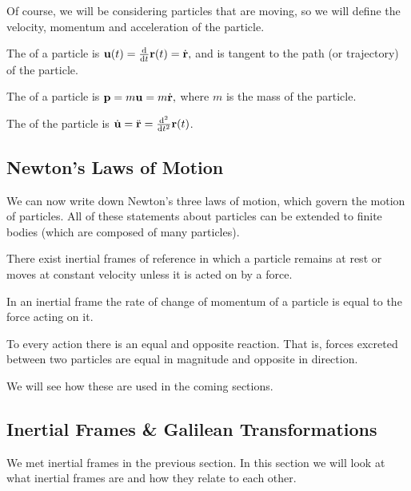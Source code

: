 \documentclass[a4paper]{scrartcl}
\newcommand{\newsection}{\subsection}
\begin{document}
Of course, we will be considering particles that are moving, so we will define the velocity, momentum and acceleration of the particle.

\begin{definition}[Velocity]
	The  of a particle is
	$
	\mathbf{u}(t) = \frac{\mathrm{d}}{\mathrm{d}t} \mathbf{r}(t) = \dot{\mathbf{r}},
	$
	and is tangent to the path (or trajectory) of the particle.
\end{definition}

\begin{definition}[Momentum]
	The  of a particle is
	$
	\mathbf{p} = m \mathbf{u} = m \dot{\mathbf{r}},
	$
	where $m$ is the mass of the particle.
\end{definition}

\begin{definition}[Acceleration]
	The  of the particle is $\dot{\mathbf{u}} = \ddot{\mathbf{r}} = \frac{\mathrm{d}^2}{\mathrm{d}t^2} \mathbf{r}(t)$.
\end{definition}

\newsection{Newton's Laws of Motion}

We can now write down Newton's three laws of motion, which govern the motion of particles. All of these statements about particles can be extended to finite bodies (which are composed of many particles).

\begin{law*}
There exist inertial frames of reference in which a particle remains at rest or moves at constant velocity unless it is acted on by a force.
\end{law*}

\begin{law*}
	In an inertial frame the rate of change of momentum of a particle is equal to the force acting on it.
\end{law*}

\begin{law*}
To every action there is an equal and opposite reaction. That is, forces excreted between two particles are equal in magnitude and opposite in direction.
\end{law*}

We will see how these are used in the coming sections.

\newsection{Inertial Frames \& Galilean Transformations}

We met inertial frames in the previous section. In this section we will look at what inertial frames are and how they relate to each other.
\end{document}
